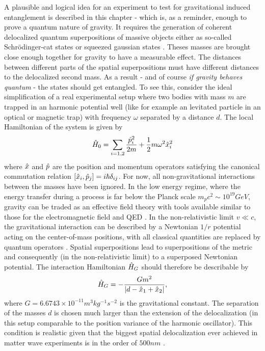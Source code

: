 A plausible and logical idea for an experiment to test for gravitational induced entanglement is described in this chapter - which is, as a reminder, enough to prove a quantum nature of gravity.
It requires the generation of coherent delocalized quantum superpositions of massive objects either as so-called Schrödinger-cat states or squeezed gaussian states \cite{Bose_2017, Pedernales_2023}. Theses masses are brought close enough together for gravity to have a measurable effect. The distances between different parts of the spatial superpositions must have different distances to the delocalized second mass. As a result - and of course \textit{if gravity behaves quantum} - the states should get entangled.
To see this, consider the ideal simplification of a real experimental setup where two bodies with mass $m$ are trapped in an harmonic potential well (like for example an levitated particle in an optical or magnetic trap) with frequency $\omega$ separated by a distance $d$. The local Hamiltonian of the system is given by
\begin{equation}
  \hat{H}_0 = \sum_{i = 1,2} \frac{\hat{p}_i^2}{2m} + \frac{1}{2}m\omega^2\hat{x}^2_i
\end{equation}
where $\hat{x}$ and $\hat{p}$ are the position and momentum operators satisfying the canonical commutation relation $[\hat{x}_i, \hat{p}_j] = i\hbar \delta_{ij}$.
For now, all non-gravitational interactions between the masses have been ignored. 
In the low energy regime, where the energy transfer during a process is far below the Planck scale $m_p c^2 \sim 10^{19}\si{GeV}$, gravity can be traded as an effective field theory with tools available similar to those for the electromagnetic field and QED \cite{Carney_2018}. 
In the non-relativistic limit $v \ll c$, the gravitational interaction can be described by a Newtonian $1/r$ potential acting on the center-of-mass positions, with all classical quantities are replaced by quantum operators \cite{Carney_2018,Pedernales_2023,Christodoulou_2022}. 
Spatial superpositions lead to superpositions of the metric and consequently (in the non-relativistic limit) to a superposed Newtonian potential.
The interaction Hamiltonian $\hat{H}_G$ should therefore be describable by
\begin{equation}\label{eq:2:gravity-hamiltonian}
  \hat{H}_G = - \frac{Gm^2}{\left\lvert d - \hat{x}_1 + \hat{x}_2\right\rvert} ,
\end{equation}
where $G=6.6743 \times 10^{-11} \si{m^3 kg^{-1} s^{-2}}$ is the gravitational constant. The separation of the masses $d$ is chosen much larger than the extension of the delocalization (in this setup comparable to the position variance of the harmonic oscillator). This condition is realistic given that the biggest spatial delocalization ever achieved in matter wave experiments is in the order of $500\si{nm}$ \cite{Fein_2019}.
